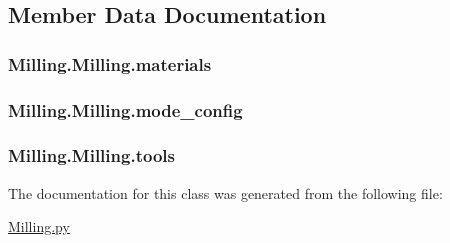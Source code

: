 \subsection{Member Data Documentation}
\hypertarget{class_milling_1_1_milling_abfe2fc691de0e96daeabfa54c923cd49}{}
\subsubsection[{materials}]{\setlength{\rightskip}{0pt plus 5cm}Milling.\+Milling.\+materials}\label{class_milling_1_1_milling_abfe2fc691de0e96daeabfa54c923cd49}
\hypertarget{class_milling_1_1_milling_a082414fc35afc6686d84e08716cb528e}{}
\subsubsection[{mode\+\_\+config}]{\setlength{\rightskip}{0pt plus 5cm}Milling.\+Milling.\+mode\+\_\+config}\label{class_milling_1_1_milling_a082414fc35afc6686d84e08716cb528e}
\hypertarget{class_milling_1_1_milling_a5a69f8b51168e80e5bb692c6f2a6e36b}{}
\subsubsection[{tools}]{\setlength{\rightskip}{0pt plus 5cm}Milling.\+Milling.\+tools}\label{class_milling_1_1_milling_a5a69f8b51168e80e5bb692c6f2a6e36b}


The documentation for this class was generated from the following file\+:\begin{DoxyCompactItemize}
\item 
\hyperlink{_milling_8py}{Milling.\+py}\end{DoxyCompactItemize}

